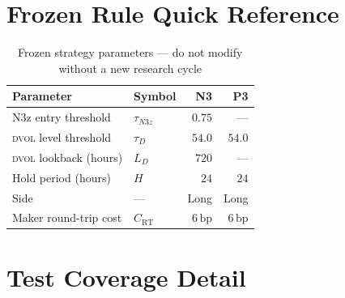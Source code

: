\documentclass[12pt, a4paper]{article}
\theoremstyle{definition}
\newcommand{\bp}{\,\text{bp}}
\newcommand{\DVOL}{\textsc{dvol}}
\begin{document}
\appendix
\section{Frozen Rule Quick Reference}

\begin{table}[H]
\centering
\caption{Frozen strategy parameters — do not modify without a new research cycle}
\begin{tabular}{llrr}
\toprule
\textbf{Parameter} & \textbf{Symbol} & \textbf{N3} & \textbf{P3} \\
\midrule
N3z entry threshold      & $\tau_{N3z}$  & $0.75$  & — \\
\DVOL{} level threshold  & $\tau_D$       & $54.0$  & $54.0$ \\
\DVOL{} lookback (hours) & $L_D$          & $720$   & — \\
Hold period (hours)      & $H$            & $24$    & $24$ \\
Side                     & —              & Long    & Long \\
Maker round-trip cost    & $C_\text{RT}$  & $6\bp$  & $6\bp$ \\
\bottomrule
\end{tabular}
\end{table}

\section{Test Coverage Detail}
\end{document}
